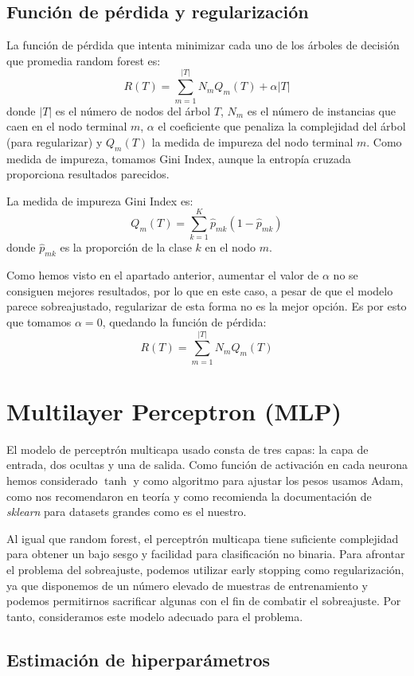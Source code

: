 \documentclass[a4]{article}
\begin{document}
\subsection{Función de pérdida y regularización}

La función de pérdida que intenta minimizar cada uno de los árboles de
decisión que promedia random forest es:
\[R(T) = \sum\limits_{m=1}^{|T|} N_mQ_m(T) + \alpha|T|\] donde $|T|$ es el número de nodos del árbol $T$, $N_m$ es el número de instancias que caen en el nodo terminal $m$, $\alpha$ el coeficiente que penaliza la complejidad del árbol (para regularizar) y $Q_m(T)$ la medida de impureza del nodo terminal $m$. Como medida de impureza, tomamos Gini Index, aunque la entropía cruzada proporciona resultados parecidos.

La medida de impureza Gini Index es:
\[Q_m(T) = \sum\limits_{k=1}^{K} \hat p_{mk}(1 - \hat p_{mk})\] donde
$\hat p_{mk}$ es la proporción de la clase $k$ en el nodo $m$.

Como hemos visto en el apartado anterior, aumentar el valor de $\alpha$ no se consiguen mejores resultados, por lo que en este caso, a pesar de que el modelo parece sobreajustado, regularizar de esta forma no es la mejor opción. Es por esto que tomamos $\alpha = 0$, quedando la función de pérdida:
\[R(T) = \sum\limits_{m=1}^{|T|} N_mQ_m(T)\]

\section{Multilayer Perceptron (MLP)}

El modelo de perceptrón multicapa usado consta de tres capas: la capa
de entrada, dos ocultas y una de salida. Como función de activación en
cada neurona hemos considerado $\tanh$ y como algoritmo para ajustar
los pesos usamos Adam, como nos recomendaron en teoría y como
recomienda la documentación de \textit{sklearn} para datasets grandes
como es el nuestro.

Al igual que random forest, el perceptrón multicapa tiene suficiente
complejidad para obtener un bajo sesgo y facilidad para clasificación
no binaria. Para afrontar el problema del sobreajuste, podemos
utilizar early stopping como regularización, ya que disponemos de un
número elevado de muestras de entrenamiento y podemos permitirnos
sacrificar algunas con el fin de combatir el sobreajuste. Por tanto, consideramos este modelo adecuado para el problema.

\subsection{Estimación de hiperparámetros}
\end{document}
